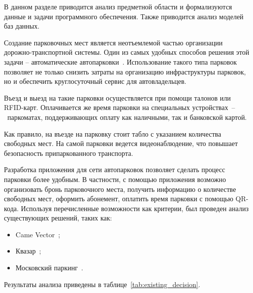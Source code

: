 \label{cha:A}
В данном разделе приводится анализ предметной области и формализуются данные и задачи программного обеспечения. Также приводится анализ моделей баз данных.

Создание парковочных мест является неотъемлемой частью организации дорожно-транспортной системы. 
Один из самых удобных способов решения этой задачи -- автоматические автопарковки~\cite{actual_autoparking}.
Использование такого типа парковок позволяет не только снизить затраты на организацию инфраструктуры парковок, но и обеспечить круглосуточный сервис для автовладельцев.

Въезд и выезд на такие парковки осуществляется при помощи талонов или  RFID-карт. Оплачивается же время парковки на специальных устройствах~--~паркоматах, поддерживающих оплату как наличными, так и банковской картой.

Как правило, на въезде на парковку стоит табло с указанием количества свободных мест. На самой парковки ведется видеонаблюдение, что повышает безопасность припаркованного транспорта.

Разработка приложения для сети автопарковок позволяет сделать процесс парковки более удобным.
В частности, с помощью приложения возможно организовать бронь парковочного места, получить информацию о количестве свободных мест, оформить абонемент, оплатить время парковки с помощью QR-кода.
Используя перечисленные возможности как критерии, был проведен анализ существующих решений, таких как: 
\begin{itemize}
	\item Came Vector~\cite{came_vector};
	\item Квазар~\cite{kvazar};
	\item Московский паркинг~\cite{parking_Moscow}.
\end{itemize}
Результаты анализа приведены в таблице~\ref{tab:existing_decision}.


